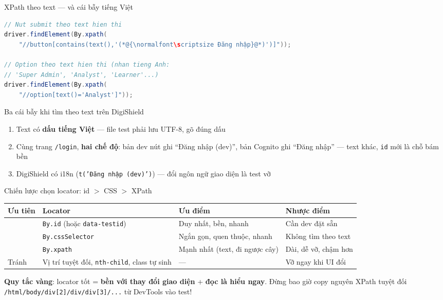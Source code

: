 \documentclass[aspectratio=169,12pt]{beamer}
\begin{document}
\begin{frame}[fragile]{XPath theo text --- và cái bẫy tiếng Việt}
\begin{lstlisting}[language=java,basicstyle=\ttfamily\scriptsize]
// Nut submit theo text hien thi
driver.findElement(By.xpath(
    "//button[contains(text(),'(*@{\normalfont\scriptsize Đăng nhập}@*)')]"));

// Option theo text hien thi (nhan tieng Anh:
// 'Super Admin', 'Analyst', 'Learner'...)
driver.findElement(By.xpath(
    "//option[text()='Analyst']"));
\end{lstlisting}

  \begin{alertblock}{Ba cái bẫy khi tìm theo text trên DigiShield}
    \begin{enumerate}
      \item Text có \textbf{dấu tiếng Việt} --- file test phải lưu UTF-8, gõ đúng dấu
      \item Cùng trang \texttt{/login}, \textbf{hai chế độ}: bản dev nút ghi
            ``Đăng nhập (dev)'', bản Cognito ghi ``Đăng nhập'' --- text khác,
            \texttt{id} mới là chỗ bám bền
      \item DigiShield có i18n (\texttt{t('Đăng nhập (dev)')}) --- đổi ngôn ngữ giao diện là test vỡ
    \end{enumerate}
  \end{alertblock}
\end{frame}

\begin{frame}{Chiến lược chọn locator: id \(>\) CSS \(>\) XPath}
  \begin{center}
  \footnotesize
  \setlength{\tabcolsep}{4pt}
  \begin{tabular}{>{\raggedright\arraybackslash}p{2.4cm}>{\raggedright\arraybackslash}p{3.4cm}>{\raggedright\arraybackslash}p{3.1cm}>{\raggedright\arraybackslash}p{2.8cm}}
    \toprule
    \textbf{Ưu tiên} & \textbf{Locator} & \textbf{Ưu điểm} & \textbf{Nhược điểm} \\
    \midrule
    1 & \texttt{By.id} (hoặc \texttt{data-testid}) & Duy nhất, bền, nhanh & Cần dev đặt sẵn \\
    2 & \texttt{By.cssSelector} & Ngắn gọn, quen thuộc, nhanh & Không tìm theo text \\
    3 & \texttt{By.xpath} & Mạnh nhất (text, đi ngược cây) & Dài, dễ vỡ, chậm hơn \\
    Tránh & Vị trí tuyệt đối, \texttt{nth-child}, class tự sinh & --- & Vỡ ngay khi UI đổi \\
    \bottomrule
  \end{tabular}
  \end{center}

  {\small \textbf{Quy tắc vàng}: locator tốt = \textbf{bền với thay đổi giao
  diện} + \textbf{đọc là hiểu ngay}. Đừng bao giờ copy nguyên XPath tuyệt đối
  \texttt{/html/body/div[2]/div/div[3]/...} từ DevTools vào test!}
\end{frame}
\end{document}
